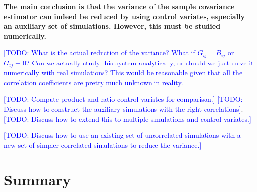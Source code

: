 \documentclass{aastex6}
\newcommand{\todo}[1]{\textcolor{blue}{[TODO: #1]}}
\begin{document}
\textbf{The main conclusion is that the variance of the sample covariance estimator can indeed be reduced by using control variates, especially an auxiliary set of simulations. However, this must be studied numerically.}

\todo{What is the actual reduction of the variance? What if $G_{ij}=B_{ij}$ or $G_{ij} = 0$? Can we actually study this system analytically, or should we just solve it numerically with real simulations? This would be reasonable given that all the correlation coefficients are pretty much unknown in reality.}

\todo{Compute product and ratio control variates for comparison.}
\todo{Discuss how to construct the auxiliary simulations with the right correlations}.
\todo{Discuss how to extend this to multiple simulations and control variates.}

\todo{Discuss how to use an existing set of uncorrelated simulations with a new set of simpler correlated simulations to reduce the variance.}

\section{Summary}
\end{document}

